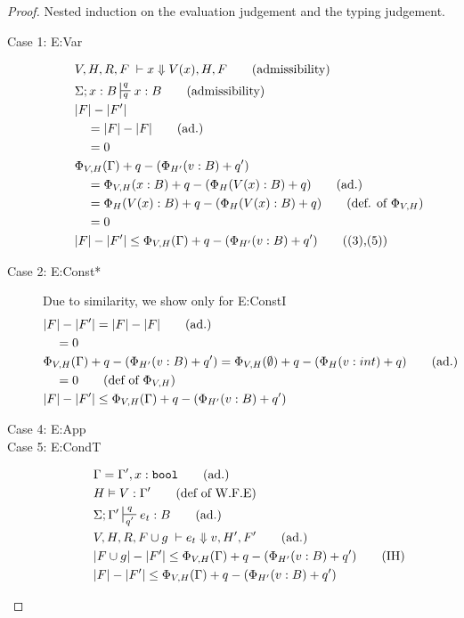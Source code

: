 \documentclass[11pt]{article}
\newcommand{\irl}[1]{\mathtt{#1}}
\theoremstyle{definition}
\begin{document}
\begin{proof}
Nested induction on the evaluation judgement and the typing judgement.\\
\begin{description}
  \item[Case 1: E:Var]
  \begin{align}
  &V,H,R,F \; \vdash x \Downarrow V(x),H,F \tag{admissibility}\\
  &\Sigma; x : B \sststile{q}{q} x : B \tag{admissibility}\\
  &|F| - |F'|\\
  &\quad = |F| - |F| \tag{ad.}\\
  &\quad = 0\\
  &\Phi_{V,H}(\Gamma) + q - (\Phi_{H'}(v:B) + q')\\
  &\quad = \Phi_{V,H}(x : B) + q - (\Phi_{H}(V(x) : B) + q) \tag{ad.}\\
  &\quad = \Phi_{H}(V(x) : B) + q  - (\Phi_{H}(V(x) : B) + q) \tag{def. of $\Phi_{V,H}$}\\
  &\quad = 0\\
  &|F| - |F'| \le \Phi_{V,H}(\Gamma) +q - (\Phi_{H'}(v:B) + q') \tag{(3),(5)}
  \end{align}
  \item[Case 2: E:Const*]
  Due to similarity, we show only for E:ConstI
  \begin{align*}
  &|F| - |F'| = |F| - |F| \tag{ad.}\\
  &\quad = 0\\
  &\Phi_{V,H}(\Gamma) +q - (\Phi_{H'}(v:B) + q') = \Phi_{V,H}(\emptyset) +q - (\Phi_{H}(v:int) + q) \tag{ad.}\\
  &\quad = 0 \tag{def of $\Phi_{V,H}$}\\
  &|F| - |F'| \le \Phi_{V,H}(\Gamma) +q - (\Phi_{H'}(v:B) + q')
  \end{align*}
  \item[Case 4: E:App]
  \item[Case 5: E:CondT]
  \begin{align*}
  &\Gamma = \Gamma', x : \irl{bool} \tag{ad.}\\
  &H \vDash V : \Gamma' \tag{def of W.F.E}\\
  &\Sigma; \Gamma' \sststile{q'}{q} e_t : B \tag{ad.}\\
  &V,H,R,F \cup g\; \vdash e_t \Downarrow v, H',F' \tag{ad.}\\
  &|F \cup g| - |F'| \le \Phi_{V,H}(\Gamma) +q - (\Phi_{H'}(v:B) + q') \tag{IH}\\
  &|F| - |F'| \le \Phi_{V,H}(\Gamma) +q - (\Phi_{H'}(v:B) + q') \\

\end{align*}
\end{description}
\end{proof}
\end{document}
